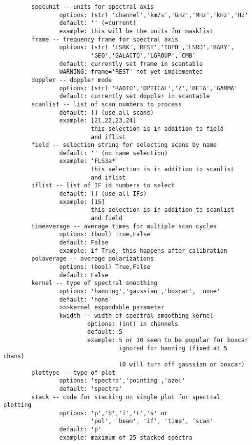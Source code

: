 \begin{verbatim}
        specunit -- units for spectral axis
                options: (str) 'channel','km/s','GHz','MHz','kHz','Hz'
                default: '' (=current)
                example: this will be the units for masklist
        frame -- frequency frame for spectral axis
                options: (str) 'LSRK','REST','TOPO','LSRD','BARY',
                         'GEO','GALACTO','LGROUP','CMB'
                default: currently set frame in scantable
                WARNING: frame='REST' not yet implemented
        doppler -- doppler mode
                options: (str) 'RADIO','OPTICAL','Z','BETA','GAMMA'
                default: currently set doppler in scantable
        scanlist -- list of scan numbers to process
                default: [] (use all scans)
                example: [21,22,23,24]
                         this selection is in addition to field
                         and iflist
        field -- selection string for selecting scans by name
                default: '' (no name selection)
                example: 'FLS3a*'
                         this selection is in addition to scanlist
                         and iflist
        iflist -- list of IF id numbers to select
                default: [] (use all IFs)
                example: [15]
                         this selection is in addition to scanlist
                         and field
        timeaverage -- average times for multiple scan cycles
                options: (bool) True,False
                default: False
                example: if True, this happens after calibration
        polaverage -- average polarizations
                options: (bool) True,False
                default: False
        kernel -- type of spectral smoothing
                options: 'hanning','gaussian','boxcar', 'none'
                default: 'none'
                >>>kernel expandable parameter
                kwidth -- width of spectral smoothing kernel
                        options: (int) in channels
                        default: 5
                        example: 5 or 10 seem to be popular for boxcar
                                 ignored for hanning (fixed at 5 chans)
                                 (0 will turn off gaussian or boxcar)
        plottype -- type of plot
                options: 'spectra','pointing','azel'
                default: 'spectra'
        stack -- code for stacking on single plot for spectral plotting
                options: 'p','b','i','t','s' or
                         'pol', 'beam', 'if', 'time', 'scan'
                default: 'p'
                example: maximum of 25 stacked spectra

\end{verbatim}

